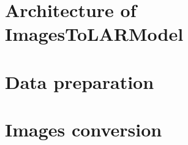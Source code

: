 
\chapter{Architecture of ImagesToLARModel}\label{Chapter31} %
\thispagestyle{empty}

\chapter{Data preparation}\label{Chapter32} %
\thispagestyle{empty}

\chapter{Images conversion}\label{Chapter33} %
\thispagestyle{empty}
